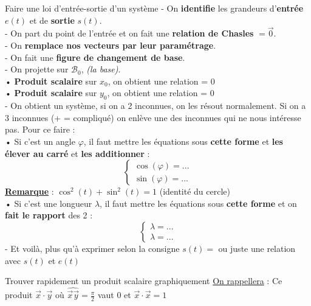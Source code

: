 \documentclass{article} %
\begin{document}
{\begin{méthode}{Faire une loi d'entrée-sortie d'un système}
- On \textbf{identifie} les grandeurs d'\textbf{entrée} $e(t)$ et de \textbf{sortie} $s(t)$.\\
- On part du point de l'entrée et on fait une \textbf{relation de Chasles} $=\overrightarrow{0}$.\\
- On \textbf{remplace nos vecteurs par leur paramétrage}.\\
- On fait une \textbf{figure de changement de base}.\\
- On projette sur $\mathcal{B}_0$, \textit{(la base)}.\\
\hspace*{20pt}• \textbf{Produit scalaire} sur $x_0$, on obtient une relation = 0\\
\hspace*{20pt}• \textbf{Produit scalaire} sur $y_0$, on obtient une relation = 0\\
- On obtient un système, si on a 2 inconnues, on les résout normalement.
Si on a 3 inconnues (+ = compliqué) on enlève une des inconnues qui ne nous intéresse pas.
Pour ce faire :\\
\hspace*{20pt}• Si c'est un angle $\varphi$, il faut mettre les équations sous \textbf{cette forme} et \textbf{les élever au carré} et \textbf{les additionner} :
$$\left\{\begin{matrix}
\cos(\varphi)=... \\
\sin(\varphi)=... 
\end{matrix}\right.$$
\hspace*{30pt}\underline{\textbf{Remarque}} : $\cos^2(t)+\sin^2(t)=1$ (identité du cercle)\vspace{4pt}\\
\hspace*{20pt}• Si c'est une longueur $\lambda$, il faut mettre les équations sous \textbf{cette forme} et on \textbf{fait le rapport} des 2 :
$$\left\{\begin{matrix}
\lambda=... \\
\lambda=... 
\end{matrix}\right.$$
- Et voilà, plus qu'à exprimer selon la consigne $s(t)=$ ou juste une relation avec $s(t)$ et $e(t)$
\end{méthode}
\begin{méthode}{Trouver rapidement un produit scalaire graphiquement}
\underline{On rappellera} : Ce produit $\overrightarrow{x}\cdot\overrightarrow{y}$ où $\widehat{\overrightarrow{x}\overrightarrow{y}}=\frac{\pi}{2}$ vaut $0$ et $\overrightarrow{x}\cdot\overrightarrow{x}=1$
\begin{center}

\end{center}
\end{méthode}}
\end{document}
